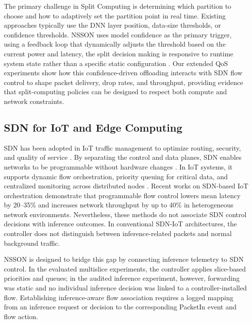 \documentclass[journal]{IEEEtran}
\begin{document}
The primary challenge in Split Computing is determining which partition to choose and how to adaptively set the partition point in real time. Existing approaches typically use the DNN layer position, data-size thresholds, or confidence thresholds. NSSON uses model confidence as the primary trigger, using a feedback loop that dynamically adjusts the threshold based on the current power and latency, the split decision making is responsive to runtime system state rather than a specific static configuration \cite{tian2026survey,zhu2023pushing,fan2025latency}.
Our extended QoS experiments show how this confidence-driven offloading interacts with SDN flow control to shape packet delivery, drop rates, and throughput, providing evidence that split-computing policies can be designed to respect both compute and network constraints.

\subsection{SDN for IoT and Edge Computing}

SDN has been adopted in IoT traffic management to optimize routing, security, and quality of service \cite{kreutz2014software}. By separating the control and data planes, SDN enables networks to be programmable without hardware changes \cite{mckeown2008openflow}. In IoT systems, it supports dynamic flow orchestration, priority queuing for critical data, and centralized monitoring across distributed nodes \cite{siddiqui2022toward,jazaeri2021edge,lo2023sdn,ray2025internet}.
Recent works on SDN-based IoT orchestration demonstrate that programmable flow control lowers mean latency by 20--35\% and increases network throughput by up to 40\% in heterogeneous network environments. Nevertheless, these methods do not associate SDN control decisions with inference outcomes. In conventional SDN-IoT architectures, the controller does not distinguish between inference-related packets and normal background traffic.

NSSON is designed to bridge this gap by connecting inference telemetry to SDN control. In the evaluated multislice experiments, the controller applies slice-based priorities and queues; in the audited inference experiment, however, forwarding was static and no individual inference decision was linked to a controller-installed flow. Establishing inference-aware flow association requires a logged mapping from an inference request or decision to the corresponding PacketIn event and flow action.
\end{document}
